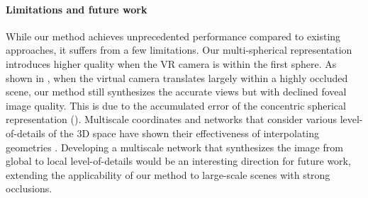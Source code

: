 \paragraph{Limitations and future work}
While our method achieves unprecedented performance compared to existing approaches, it suffers from a few limitations. Our multi-spherical representation introduces higher quality when the VR camera is within the first sphere. As shown in , when the virtual camera translates largely within a highly occluded scene, our method still synthesizes the accurate views but with declined foveal image quality. This is due to the accumulated error of the concentric spherical representation ().
Multiscale coordinates and networks that consider various level-of-details of the 3D space have shown their effectiveness of interpolating geometries \cite{winkler2010multi}. Developing a multiscale network that synthesizes the image from global to local level-of-details would be an interesting direction for future work, extending the applicability of our method to large-scale scenes with strong occlusions.
